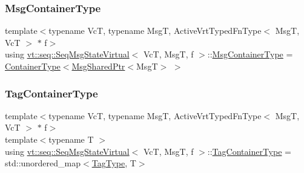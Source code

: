 \subsubsection{\texorpdfstring{Msg\+Container\+Type}{MsgContainerType}}
{\footnotesize\ttfamily template$<$typename VcT, typename MsgT, Active\+Vrt\+Typed\+Fn\+Type$<$ Msg\+T, Vc\+T $>$ $\ast$ f$>$ \\
using \hyperlink{structvt_1_1seq_1_1_seq_msg_state_virtual}{vt\+::seq\+::\+Seq\+Msg\+State\+Virtual}$<$ VcT, MsgT, f $>$\+::\hyperlink{structvt_1_1seq_1_1_seq_msg_state_virtual_a04ba59629edd91369fb4dcb17784c370}{Msg\+Container\+Type} =  \hyperlink{structvt_1_1seq_1_1_seq_msg_state_virtual_a271216687b589ec1d08d4da5cdbb5177}{Container\+Type}$<$\hyperlink{namespacevt_ab2b3d506ec8e8d1540aede826d84a239}{Msg\+Shared\+Ptr}$<$MsgT$>$ $>$}

\mbox{\label{structvt_1_1seq_1_1_seq_msg_state_virtual_a64d396aacb60dcc361f846d807bd074a}} 
\subsubsection{\texorpdfstring{Tag\+Container\+Type}{TagContainerType}}
{\footnotesize\ttfamily template$<$typename VcT, typename MsgT, Active\+Vrt\+Typed\+Fn\+Type$<$ Msg\+T, Vc\+T $>$ $\ast$ f$>$ \\
template$<$typename T $>$ \\
using \hyperlink{structvt_1_1seq_1_1_seq_msg_state_virtual}{vt\+::seq\+::\+Seq\+Msg\+State\+Virtual}$<$ VcT, MsgT, f $>$\+::\hyperlink{structvt_1_1seq_1_1_seq_msg_state_virtual_a64d396aacb60dcc361f846d807bd074a}{Tag\+Container\+Type} =  std\+::unordered\+\_\+map$<$\hyperlink{namespacevt_a84ab281dae04a52a4b243d6bf62d0e52}{Tag\+Type}, T$>$}

\mbox{\label{structvt_1_1seq_1_1_seq_msg_state_virtual_a1298c226eeddc2e8fbd58bf1b92ef2aa}} 

